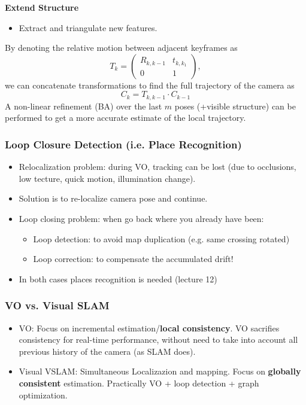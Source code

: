 \documentclass[a4paper,12 pt]{article}
\theoremstyle{definition}
\theoremstyle{remark}
\theoremstyle{definition}
\theoremstyle{definition}
\theoremstyle{definition}
\theoremstyle{remark}
\theoremstyle{definition}
\begin{document}
\textbf{Extend Structure}
\begin{itemize}
\item Extract and triangulate new features.
\end{itemize}
By denoting the relative motion between adjacent keyframes as
\begin{equation}
T_k=\begin{pmatrix}
R_{k,k-1}&t_{k,k_1}\\
0&1
\end{pmatrix},
\end{equation}
we can concatenate transformations to find the full trajectory of the camera as
\begin{equation}
C_k=T_{k,k-1}\cdot C_{k-1}
\end{equation}
A non-linear refinement (BA) over the last $m$ poses (+visible structure) can be performed to get a more accurate estimate of the local trajectory. 
\subsubsection*{Loop Closure Detection (i.e. Place Recognition)}
\begin{itemize}
\item Relocalization problem: during VO, tracking can be lost (due to occlusions, low tecture, quick motion, illumination change).
\item Solution is to re-localize camera pose and continue.
\item Loop closing problem: when go back where you already have been:
\begin{itemize}
\item Loop detection: to avoid map duplication (e.g. same crossing rotated)
\item Loop correction: to compensate the accumulated drift!
\end{itemize}
\item In both cases places recognition is needed (lecture 12)
\end{itemize}
\subsubsection*{VO vs. Visual SLAM}
\begin{itemize}
\item VO: Focus on incremental estimation/\textbf{local consistency}. VO sacrifies consistency for real-time performance, without need to take into account all previous history of the camera (as SLAM does).
\item Visual VSLAM: Simultaneous Localizazion and mapping. Focus on \textbf{globally consistent} estimation. Practically VO + loop detection + graph optimization.
\end{itemize}
\end{document}
